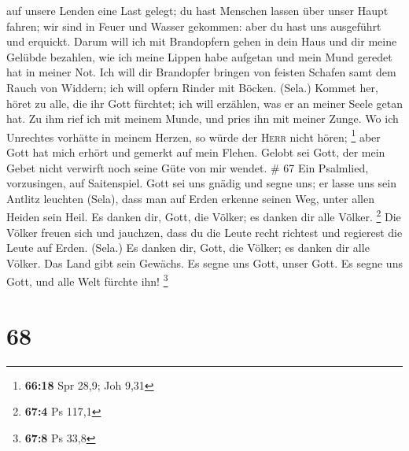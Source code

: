 auf unsere Lenden eine Last gelegt;  du hast Menschen
lassen über unser Haupt fahren; wir sind in Feuer und Wasser gekommen:
aber du hast uns ausgeführt und erquickt.  Darum will ich
mit Brandopfern gehen in dein Haus und dir meine Gelübde bezahlen,
 wie ich meine Lippen habe aufgetan und mein Mund geredet
hat in meiner Not.  Ich will dir Brandopfer bringen von
feisten Schafen samt dem Rauch von Widdern; ich will opfern Rinder mit
Böcken. (Sela.)  Kommet her, höret zu alle, die ihr Gott
fürchtet; ich will erzählen, was er an meiner Seele getan hat.
 Zu ihm rief ich mit meinem Munde, und pries ihn mit
meiner Zunge.  Wo ich Unrechtes vorhätte in meinem
Herzen, so würde der \textsc{Herr} nicht hören; \footnote{\textbf{66:18}
  Spr 28,9; Joh 9,31}  aber Gott hat mich erhört und
gemerkt auf mein Flehen.  Gelobt sei Gott, der mein Gebet
nicht verwirft noch seine Güte von mir wendet. \# 67  Ein
Psalmlied, vorzusingen, auf Saitenspiel.  Gott sei uns
gnädig und segne uns; er lasse uns sein Antlitz leuchten (Sela),
 dass man auf Erden erkenne seinen Weg, unter allen Heiden
sein Heil.  Es danken dir, Gott, die Völker; es danken dir
alle Völker. \footnote{\textbf{67:4} Ps 117,1}  Die Völker
freuen sich und jauchzen, dass du die Leute recht richtest und regierest
die Leute auf Erden. (Sela.)  Es danken dir, Gott, die
Völker; es danken dir alle Völker.  Das Land gibt sein
Gewächs. Es segne uns Gott, unser Gott.  Es segne uns
Gott, und alle Welt fürchte ihn! \footnote{\textbf{67:8} Ps 33,8}

\hypertarget{section-25}{%
\section{68}\label{section-25}}

